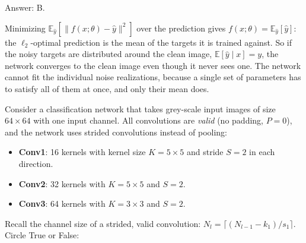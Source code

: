 \documentclass[11pt]{exam}
\newcommand{\TFT}{\ifprintanswers\textbf{TRUE}\hspace{1.1em}False\else True\hspace{1.1em}False\fi}
\newcommand{\TFF}{True\hspace{1.1em}\ifprintanswers\textbf{FALSE}\else False\fi}
\begin{document}
\begin{questions}
\begin{solution}
  Answer: B.

  Minimizing $\mathbb{E}_{\hat y}[\|f(x;\theta) - \hat y\|^2]$ over the prediction gives
  $f(x;\theta) = \mathbb{E}_{\hat y}[\hat y]$: the $\ell_2$-optimal prediction is the mean of the
  targets it is trained against. So if the noisy targets are distributed around the clean image,
  $\mathbb{E}[\hat y \mid x] = y$, the network converges to the clean image even though it never
  sees one. The network cannot fit the individual noise realizations, because a single set of
  parameters has to satisfy all of them at once, and only their mean does.
\end{solution}

\question
Consider a classification network that takes grey-scale input images of size $64 \times 64$ with
one input channel. All convolutions are \emph{valid} (no padding, $P = 0$), and the network uses
strided convolutions instead of pooling:

\begin{itemize}
  \item \textbf{Conv1}: 16 kernels with kernel size $K = 5 \times 5$ and stride $S = 2$ in each
    direction.
  \item \textbf{Conv2}: 32 kernels with $K = 5 \times 5$ and $S = 2$.
  \item \textbf{Conv3}: 64 kernels with $K = 3 \times 3$ and $S = 2$.
\end{itemize}

\noindent Recall the channel size of a strided, valid convolution:
$N_l = \lceil (N_{l-1} - k_1)/s_1 \rceil$. Circle True or False:

\end{questions}
\end{document}
